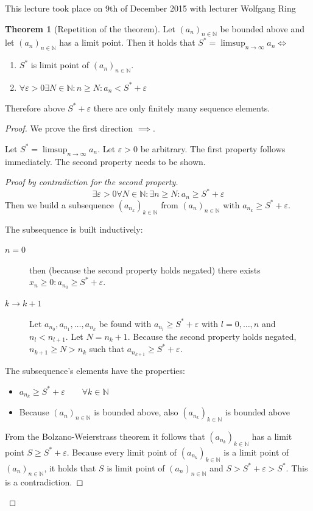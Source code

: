 \documentclass[a4paper,landscape,twocolumn]{article}
\theoremstyle{definition}
\newtheorem{theorem}{Theorem}
\newcommand\seq[1]{{\left(#1\right)}_{n \in \mathbb N}}
\newcommand\meta[3]{\begin{mdframed}[skipbelow=4pt,skipabove=4pt,innermargin=1pt,innerleftmargin=1pt,innerrightmargin=1pt]\begin{center}\small{\textdownarrow{} This #1 took place on #2 with lecturer #3}\end{center}\end{mdframed}}
\begin{document}
\meta{lecture}{9th of December 2015}{Wolfgang Ring}
\begin{theorem}[Repetition of the theorem]
  Let $\seq{a_n}$ be bounded above and let $\seq{a_n}$ has a limit point.
  Then it holds that $S^* = \limsup_{n\to\infty} a_n \iff$
  \begin{enumerate}
    \item $S^*$ is limit point of $\seq{a_n}$.
    \item $\forall \varepsilon > 0 \exists N \in \mathbb N: n \geq N: a_n < S^* + \varepsilon$
  \end{enumerate}
  Therefore above $S^* + \varepsilon$ there are only finitely many sequence elements.
\end{theorem}
\begin{proof}
  We prove the first direction $\implies$.

  Let $S^* = \limsup_{n\to\infty} a_n$. Let $\varepsilon > 0$ be arbitrary.
  The first property follows immediately.
  The second property needs to be shown.

  \begin{proof}[Proof by contradiction for the second property]
    \[ \exists \varepsilon > 0 \forall N \in \mathbb N: \exists n \geq N: a_n \geq S^* + \varepsilon \]
    Then we build a subsequence $\left(a_{n_k}\right)_{k\in\mathbb N}$ from $\seq{a_n}$ with $a_{n_k} \geq S^* + \varepsilon$.

    The subsequence is built inductively:
    \begin{description}
      \item[$n = 0$]
        then (because the second property holds negated) there exists $x_n \geq 0: a_{n_0} \geq S^* + \varepsilon$.
      \item[$k \to k+1$]
        Let $a_{n_0}, a_{n_1}, \dots, a_{n_k}$ be found with $a_{n_l} \geq S^* + \varepsilon$ with $l = 0, \dots, n$
        and $n_l < n_{l+1}$. Let $N = n_k + 1$. Because the second property holds negated, $n_{k+1} \geq N > n_k$
        such that $a_{n_{k+1}} \geq S^* + \varepsilon$.
    \end{description}

    The subsequence's elements have the properties:
    \begin{itemize}
      \item $a_{n_k} \geq S^* + \varepsilon \qquad \forall k \in \mathbb N$
      \item Because $\seq{a_n}$ is bounded above, also $\left(a_{n_k}\right)_{k\in\mathbb N}$ is bounded above
    \end{itemize}
    From the Bolzano-Weierstrass theorem it follows that $\left(a_{n_k}\right)_{k\in\mathbb N}$ has a limit point
    $S \geq S^* + \varepsilon$. Because every limit point of $\left(a_{n_k}\right)_{k\in\mathbb N}$ is a limit point
    of $\seq{a_n}$, it holds that $S$ is limit point of $\seq{a_n}$ and $S > S^* + \varepsilon > S^*$.
    This is a contradiction.
  \end{proof}


\end{proof}
\end{document}
